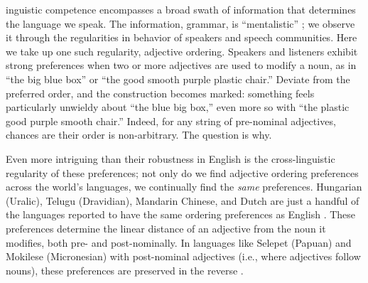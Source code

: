 \documentclass{pnastwo}
\begin{document}
\begin{article}
\begin{abstract}
{Abstract here\ldots}
\end{abstract}



inguistic competence encompasses a broad swath of information that determines the language we speak. The information, grammar, is ``mentalistic'' \cite{chomsky1965}; we observe it through the regularities in behavior of speakers and speech communities. Here we take up one such regularity, adjective ordering. Speakers and listeners exhibit strong preferences when two or more adjectives are used to modify a noun, as in ``the big blue box'' or ``the good smooth purple plastic chair.'' Deviate from the preferred order, and the construction becomes marked: something feels particularly unwieldy about ``the blue big box,'' even more so with ``the plastic good purple smooth chair.'' Indeed, for any string of pre-nominal adjectives, chances are their order is non-arbitrary. The question is why.

Even more intriguing than their robustness in English is the cross-linguistic regularity of these preferences; not only do we find adjective ordering preferences across the world's languages, we continually find the \emph{same} preferences. Hungarian (Uralic), Telugu (Dravidian), Mandarin Chinese, and Dutch are just a handful of the languages reported to have the same ordering preferences as English \cite{dixon1982,sproatshih1991,martin1969competence,hetzron1978,lapollahuang2004}. These preferences determine the linear distance of an adjective from the noun it modifies, both pre- and post-nominally. In languages like Selepet (Papuan) and Mokilese (Micronesian) with post-nominal adjectives (i.e., where adjectives follow nouns), these preferences are preserved in the reverse \cite{dixon1982,sproatshih1991}. 


\end{article}
\end{document}
